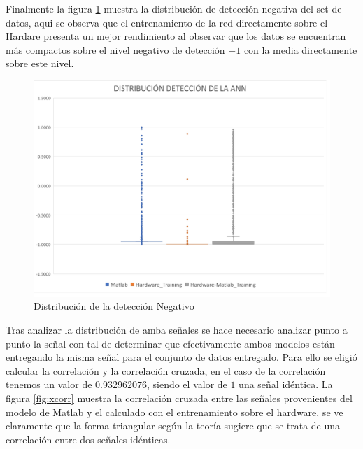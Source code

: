 Finalmente la figura \ref{fig:DistN} muestra la distribución de detección negativa del set de datos, aqui se observa que el entrenamiento de la red directamente sobre el Hardare presenta un mejor rendimiento al observar que los datos se encuentran más compactos sobre el nivel negativo de detección $-1$ con la media directamente sobre este nivel.

\begin{figure}[H]
	\centering
		\includegraphics[scale=0.6]{./Figures/Distribucion2}
	\caption{Distribución de la detección Negativo}
	\label{fig:DistN}
\end{figure}

Tras analizar la distribución de amba señales se hace necesario analizar punto a punto la señal con tal de determinar que efectivamente ambos modelos están entregando la misma señal para el conjunto de datos entregado. Para ello se eligió calcular la correlación y la correlación cruzada, en el caso de la correlación tenemos un valor de $0.932962076$, siendo el valor de $1$ una señal idéntica. La figura \ref{fig:xcorr} muestra la correlación cruzada entre las señales provenientes del modelo de Matlab y el calculado con el entrenamiento sobre el hardware, se ve claramente que la forma triangular según la teoría sugiere que se trata de una correlación entre dos señales idénticas.

